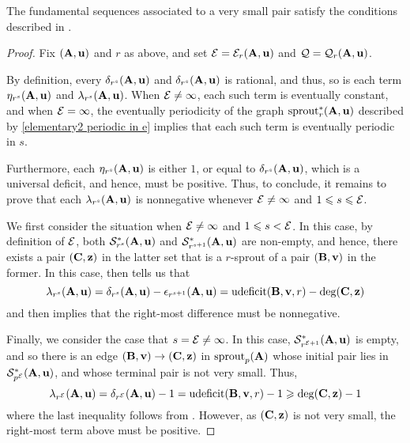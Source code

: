 \documentclass{amsart}
\begin{document}
\begin{proposition}
\label{finishing-with-the-fundamental-sequences: P}
The fundamental sequences associated to a very small pair satisfy the conditions described in .  
\end{proposition}

\begin{proof} 
   Fix $(\mathbf{A},\mathbf{u})$ and $r$ as above, and set $\mathcal{E}=\mathcal{E}_r(\mathbf{A},\mathbf{u})$ and $\mathcal{Q} = \mathcal{Q}_r(\mathbf{A},\mathbf{u})$.  
   
   By definition, every $\delta_{r^s}(\mathbf{A}, \mathbf{u})$ and $\delta_{r^s}(\mathbf{A}, \mathbf{u})$ is rational, and thus, so is each term $\eta_{r^s}(\mathbf{A}, \mathbf{u})$ and $\lambda_{r^s}(\mathbf{A}, \mathbf{u})$.  When $\mathcal{E} \neq \infty$,  each such term is eventually constant, and when $\mathcal{E} = \infty$,  the eventually periodicity of the graph $\operatorname{sprout}_r^{\ast}(\mathbf{A}, \mathbf{u})$ described by \eqref{elementary2 periodic in e} implies that each such term is eventually periodic in $s$.  
   
Furthermore, each $\eta_{r^s}(\mathbf{A}, \mathbf{u})$ is either $1$, or equal to $\delta_{r^s}(\mathbf{A}, \mathbf{u})$, which is a universal deficit, and hence, must be positive.  Thus, to conclude, it remains to prove that each $\lambda_{r^s}(\mathbf{A}, \mathbf{u})$ is nonnegative whenever $\mathcal{E} \neq \infty$ and $1 \leqslant s \leqslant \mathcal{E}$.

We first consider the situation when $\mathcal{E} \neq \infty$ and $1 \leqslant s < \mathcal{E}$.   In this case, by definition of $\mathcal{E}$, both $\mathcal{S}_{r^{s}}^{\ast}(\mathbf{A}, \mathbf{u})$ and $\mathcal{S}_{r^{s+1}}^{\ast}(\mathbf{A}, \mathbf{u})$ are non-empty, and hence, there exists a pair $(\mathbf{C}, \mathbf{z})$ in the latter set that is a $r$-sprout of a pair $(\mathbf{B}, \mathbf{v})$ in the former.  In this case,  then tells us that 
\[ \lambda_{r^s}(\mathbf{A}, \mathbf{u}) = \delta_{r^s}(\mathbf{A}, \mathbf{u}) - \epsilon_{r^{s+1}}(\mathbf{A}, \mathbf{u}) = \operatorname{udeficit}(\mathbf{B}, \mathbf{v}, r) - \deg(\mathbf{C}, \mathbf{z}) \]  
 and  then implies that the right-most difference must be nonnegative.  
 
Finally, we consider the case that $s = \mathcal{E} \neq \infty$.  In this case,  $\mathcal{S}^{\ast}_{r^{\mathcal{E}+1}}(\mathbf{A},\mathbf{u})$ is empty, and so there is an edge $(\mathbf{B},\mathbf{v}) \to (\mathbf{C},\mathbf{z})$ in $\operatorname{sprout}_p(\mathbf{A})$ whose initial pair lies in $\mathcal{S}^{\ast}_{p^{\mathcal{E}}}(\mathbf{A},\mathbf{u})$, and whose terminal pair is not very small. Thus, 
\[ \lambda_{r^{\mathcal{E}}}(\mathbf{A}, \mathbf{u}) = \delta_{r^{\mathcal{E}}}(\mathbf{A}, \mathbf{u}) - 1 = \operatorname{udeficit}(\mathbf{B}, \mathbf{v}, r) - 1 \geqslant \deg(\mathbf{C}, \mathbf{z}) - 1   \] where the last inequality follows from .   However, as $(\mathbf{C}, \mathbf{z})$ is not very small, the right-most term above must be positive.
\end{proof}
\end{document}
